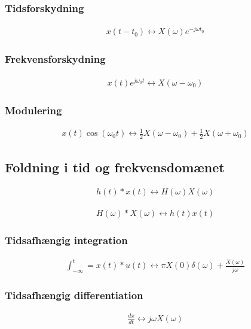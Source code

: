 	\subsubsection{Tidsforskydning}
		\begin{align}
			x(t-t_0)\leftrightarrow X(\omega)e^{-j\omega t_0}
		\end{align}

	\subsubsection{Frekvensforskydning}
		\begin{align}
			x(t)e^{j\omega_0t}\leftrightarrow X(\omega-\omega_0)
		\end{align}

	\subsubsection{Modulering}
		\begin{align}
			x(t)\cos(\omega_0t)\leftrightarrow\frac{1}{2}X(\omega-\omega_0)+\frac{1}{2}X(\omega+\omega_0)
		\end{align}

\subsection{Foldning i tid og frekvensdomænet}
	\begin{align}
		h(t)*x(t)\leftrightarrow H(\omega)X(\omega)
	\end{align}

	\begin{align}
		H(\omega)*X(\omega)\leftrightarrow h(t)x(t)
	\end{align}

	\subsubsection{Tidsafhængig integration}
		\begin{align}
			\int_{-\infty}^{t}=x(t)*u(t)\leftrightarrow\pi X(0)\delta(\omega)+\frac{X(\omega)}{j\omega}
		\end{align}
	
	\subsubsection{Tidsafhængig differentiation}
		\begin{align}
			\frac{dx}{dt}\leftrightarrow j\omega X(\omega)
		\end{align}

